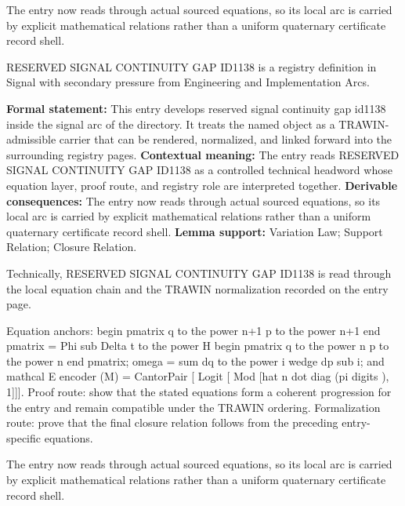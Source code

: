 The entry now reads through actual sourced equations, so its local arc is carried by explicit mathematical relations rather than a uniform quaternary certificate record shell.
\clearpage


\begingroup\small
{}
RESERVED SIGNAL CONTINUITY GAP ID1138 is a registry definition in Signal with secondary pressure from Engineering and Implementation Arcs.

\begingroup\footnotesize\setlength{\emergencystretch}{3em}\sloppy
\textbf{Formal statement:} This entry develops reserved signal continuity gap id1138 inside the signal arc of the directory. It treats the named object as a TRAWIN-admissible carrier that can be rendered, normalized, and linked forward into the surrounding registry pages. \textbf{Contextual meaning:} The entry reads RESERVED SIGNAL CONTINUITY GAP ID1138 as a controlled technical headword whose equation layer, proof route, and registry role are interpreted together. \textbf{Derivable consequences:} The entry now reads through actual sourced equations, so its local arc is carried by explicit mathematical relations rather than a uniform quaternary certificate record shell. \textbf{Lemma support:} Variation Law; Support Relation; Closure Relation.\par
\endgroup

Technically, RESERVED SIGNAL CONTINUITY GAP ID1138 is read through the local equation chain and the TRAWIN normalization recorded on the entry page.

Equation anchors: begin pmatrix q to the power n+1 p to the power n+1 end pmatrix = Phi sub Delta t to the power H begin pmatrix q to the power n p to the power n end pmatrix; omega = sum dq to the power i wedge dp sub i; and mathcal E encoder (M) = CantorPair [ Logit [ Mod [hat n dot diag (pi digits ), 1]]]. Proof route: show that the stated equations form a coherent progression for the entry and remain compatible under the TRAWIN ordering. Formalization route: prove that the final closure relation follows from the preceding entry-specific equations.

The entry now reads through actual sourced equations, so its local arc is carried by explicit mathematical relations rather than a uniform quaternary certificate record shell.
\endgroup


